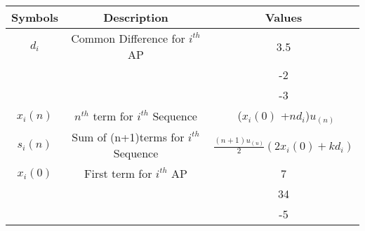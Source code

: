 \begin{enumerate}
\begin{tabular}{ |c|c|c| } 
 \hline
Symbols & Description & Values  \\
 \hline
$d_i$ & Common Difference for $i^{th}$ AP & 3.5 \\ \cline{3-3}
 & & -2 \\ \cline{3-3}
 & & -3 \\ 
\hline

  $x_i(n)$ & $n^{th}$ term for $i^{th}$ Sequence & \ ($x_i(0)$ +$nd_i$)$u_{(n)}$\\
  \hline

   $s_i(n)$ & Sum of (n+1)terms for $i^{th}$ Sequence & $\frac{(n+1)u_{(u)}}{2}(2x_i(0) + kd_i)$\\
   \hline

  $x_i(0)$ & First term for $i^{th}$ AP & 7 \\ \cline{3-3}
 & & 34 \\ \cline{3-3}
 & & -5 \\ 
\hline
  
   \hline
\end{tabular}
\end{enumerate}
\centering
\captionsetup{Table 1 : Parameters , Descriptions And Values }
\label{table:ee25-tab1}

